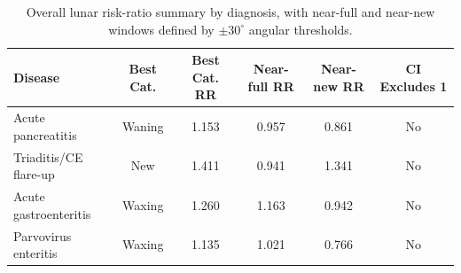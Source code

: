 \begin{table}[htbp]
\centering
\small
\begin{tabularx}{\textwidth}{>{\raggedright\arraybackslash}X c c c c c}
\hline
Disease & Best Cat. & Best Cat. RR & Near-full RR & Near-new RR & CI Excludes 1 \\
\hline
Acute pancreatitis & Waning & 1.153 & 0.957 & 0.861 & No \\
Triaditis/CE flare-up & New & 1.411 & 0.941 & 1.341 & No \\
Acute gastroenteritis & Waxing & 1.260 & 1.163 & 0.942 & No \\
Parvovirus enteritis & Waxing & 1.135 & 1.021 & 0.766 & No \\
\hline
\end{tabularx}
\caption{Overall lunar risk-ratio summary by diagnosis, with near-full and near-new windows defined by $\pm 30^{\circ}$ angular thresholds.}
\label{tab:ch4_moon_overall_summary}
\end{table}
